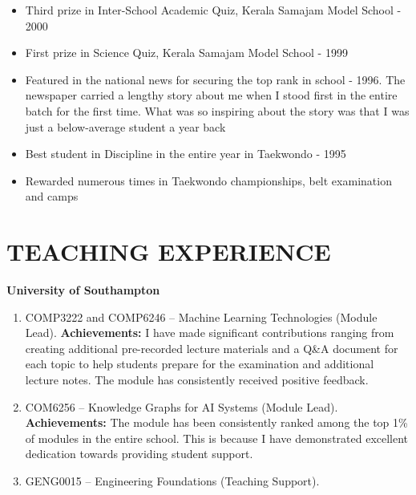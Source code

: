 \documentclass[margin]{res}
\begin{document}
\begin{resume}
\begin{itemize}
\item Third prize in Inter-School Academic Quiz, Kerala Samajam Model School - 2000\\

\item First prize in Science Quiz, Kerala Samajam Model School - 1999\\

\item Featured in the national news for securing the top rank in school - 1996. The newspaper carried a lengthy story about me when I stood first in the entire batch for the first time. What was so inspiring about the story was that I was just a below-average student a year back\\

\item Best student in Discipline in the entire year in Taekwondo - 1995 \\

\item Rewarded numerous times in Taekwondo championships, belt examination and camps
\end{itemize}

\section{TEACHING EXPERIENCE}
\textbf{University of Southampton}\\
\begin{enumerate}
    \item COMP3222 and COMP6246 -- Machine Learning Technologies (Module Lead). \textbf{Achievements:} I have made significant contributions ranging from creating additional pre-recorded lecture materials and a Q\&A document for each topic to help students prepare for the examination and additional lecture notes. The module has consistently received positive feedback.
    \item COM6256 -- Knowledge Graphs for AI Systems (Module Lead). \textbf{Achievements:} The module has been consistently ranked among the top 1\% of modules in the entire school. This is because I have demonstrated excellent dedication towards providing student support.
    \item GENG0015 -- Engineering Foundations (Teaching Support).
\end{enumerate}


\end{resume}
\end{document}
